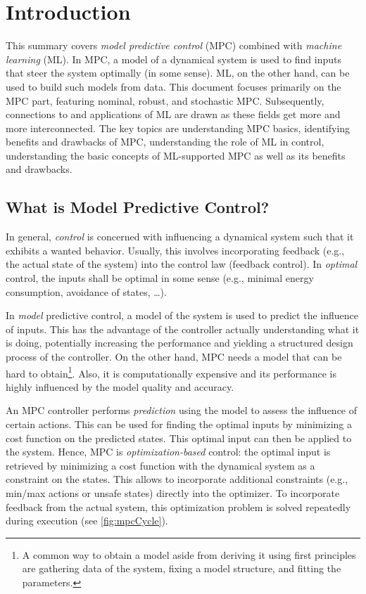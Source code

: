 \chapter{Introduction}
    This summary covers \emph{model predictive control} (MPC) combined with \emph{machine learning} (ML). In MPC, a model of a dynamical system is used to find inputs that steer the system optimally (in some sense). ML, on the other hand, can be used to build such models from data. This document focuses primarily on the MPC part, featuring nominal, robust, and stochastic MPC. Subsequently, connections to and applications of ML are drawn as these fields get more and more interconnected. The key topics are understanding MPC basics, identifying benefits and drawbacks of MPC, understanding the role of ML in control, understanding the basic concepts of ML-supported MPC as well as its benefits and drawbacks.

    \section{What is Model Predictive Control?}
        In general, \emph{control} is concerned with influencing a dynamical system such that it exhibits a wanted behavior. Usually, this involves incorporating feedback (e.g., the actual state of the system) into the control law (feedback control). In \emph{optimal} control, the inputs shall be optimal in some sense (e.g., minimal energy consumption, avoidance of states, \dots).

        In \emph{model} predictive control, a model of the system is used to predict the influence of inputs. This has the advantage of the controller actually understanding what it is doing, potentially increasing the performance and yielding a structured design process of the controller. On the other hand, MPC needs a model that can be hard to obtain\footnote{A common way to obtain a model aside from deriving it using first principles are gathering data of the system, fixing a model structure, and fitting the parameters.}. Also, it is computationally expensive and its  performance is highly influenced by the model quality and accuracy.

        An MPC controller performs \emph{prediction} using the model to assess the influence of certain actions. This can be used for finding the optimal inputs by minimizing a cost function on the predicted states. This optimal input can then be applied to the system. Hence, MPC is \emph{optimization-based} control: the optimal input is retrieved by minimizing a cost function with the dynamical system as a constraint on the states. This allows to incorporate additional constraints (e.g., min/max actions or unsafe states) directly into the optimizer. To incorporate feedback from the actual system, this optimization problem is solved repeatedly during execution (see \autoref{fig:mpcCycle}).

